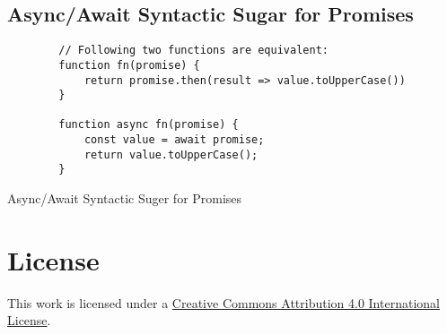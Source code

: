 \documentclass[12pt,a4paper]{article}
\begin{document}
\subsection{Async/Await Syntactic Sugar for Promises}
\begin{listing}[H]
	\begin{verbatim}
		// Following two functions are equivalent:
		function fn(promise) {
			return promise.then(result => value.toUpperCase())
		}

		function async fn(promise) {
			const value = await promise;
			return value.toUpperCase();
		}
	\end{verbatim}
	\caption{Async/Await Syntactic Suger for Promises}
\end{listing}





\section*{License}
\ccby\thinspace\thinspace This work is licensed under a \href{https://creativecommons.org/licenses/by/4.0/}{Creative Commons Attribution 4.0 International License}.
\end{document}

